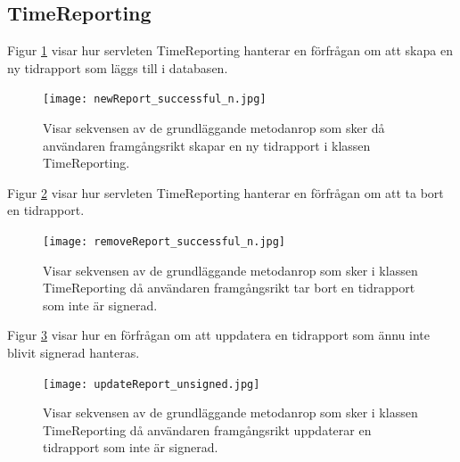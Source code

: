 \documentclass[a4paper]{article}
\begin{document}
\subsection{TimeReporting}
Figur \ref{newReport} visar hur servleten TimeReporting hanterar en förfrågan om att skapa en ny tidrapport som läggs till i databasen.

\begin{figure}[h!]
\centering
\texttt{[image: newReport\_successful\_n.jpg]}
\caption{Visar sekvensen av de grundläggande metodanrop som sker då användaren framgångsrikt skapar en ny tidrapport i klassen TimeReporting.
\label{newReport}}
\end{figure}

\noindent
Figur \ref{removeReport} visar hur servleten TimeReporting hanterar en förfrågan om att ta bort en tidrapport.

\begin{figure}[h!]
\centering
\texttt{[image: removeReport\_successful\_n.jpg]}
\caption{Visar sekvensen av de grundläggande metodanrop som sker i klassen TimeReporting då användaren framgångsrikt tar bort en tidrapport som inte är signerad.
\label{removeReport}}
\end{figure}


\noindent
Figur \ref{updateReportUnsigned} visar hur en förfrågan om att uppdatera en tidrapport som ännu inte blivit signerad hanteras.


\begin{figure}[h!]
\centering
\texttt{[image: updateReport\_unsigned.jpg]}
\caption{Visar sekvensen av de grundläggande metodanrop som sker i klassen TimeReporting då användaren framgångsrikt uppdaterar en tidrapport som inte är signerad.
\label{updateReportUnsigned}}
\end{figure}
\end{document}
